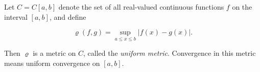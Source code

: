 Let $C = C[a, b]$ denote the set of all real-valued continuous functions $f$ on the interval $[a, b]$, and define

$$\varrho(f, g) = \sup_{a \leq x \leq b} |f(x) - g(x)|.$$

Then $\varrho$ is a metric on $C$, called the \emph{uniform metric}. Convergence in this metric means uniform convergence on $[a, b]$.
